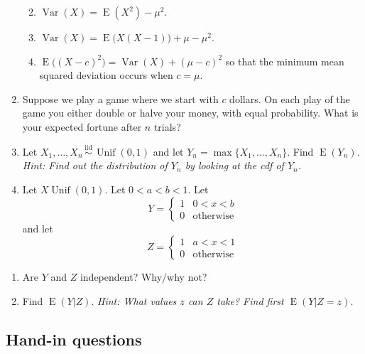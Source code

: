 \documentclass[
]{book}
\providecommand{\tightlist}{%
  \setlength{\itemsep}{0pt}\setlength{\parskip}{0pt}}
\DeclareMathOperator{\E}{E}
\DeclareMathOperator{\Var}{Var}
\DeclareMathOperator{\Unif}{Unif}
\newcommand{\iid}{\,\overset{\text{iid}}{\sim}\,}
\theoremstyle{definition}
\theoremstyle{definition}
\theoremstyle{definition}
\theoremstyle{definition}
\theoremstyle{remark}
\begin{document}
\begin{enumerate}
  \begin{enumerate}
  \def\labelenumii{(\alph{enumii})}
  \tightlist
  \item
    \(\Var(X) = \E(X^2) - \mu^2\).
  \item
    \(\Var(X) = \E\big(X(X-1)\big) +\mu -\mu^2\).
  \item
    \(\E\big((X-c)^2\big) = \Var(X) + (\mu-c)^2\) so that the minimum mean squared deviation occurs when \(c=\mu\).
  \end{enumerate}
\item
  Suppose we play a game where we start with \(c\) dollars. On each play of the game you either double or halve your money, with equal probability. What is your expected fortune after \(n\) trials?
\item
  Let \(X_1,\dots,X_n\iid \Unif(0,1)\) and let \(Y_n=\max\{X_1,\dots,X_n\}\). Find \(\E(Y_n)\). \emph{Hint: Find out the distribution of \(Y_n\) by looking at the cdf of \(Y_n\).}
\item
  Let \(X\Unif(0,1)\). Let \(0<a<b<1\). Let
  \[
   Y = \begin{cases}
  1 & 0<x<b \\
  0 &\text{otherwise}
   \end{cases}
  \]
  and let
  \[
   Z = \begin{cases}
  1 & a<x<1 \\
  0 &\text{otherwise}
   \end{cases}
  \]
\end{enumerate}

\begin{enumerate}
\def\labelenumi{(\alph{enumi})}
\tightlist
\item
  Are \(Y\) and \(Z\) independent? Why/why not?\\
\item
  Find \(\E(Y|Z)\). \emph{Hint: What values \(z\) can \(Z\) take? Find first \(\E(Y|Z=z)\).}
\end{enumerate}

\hypertarget{hand-in-questions}{%
\subsection*{Hand-in questions}\label{hand-in-questions}}
\end{document}
